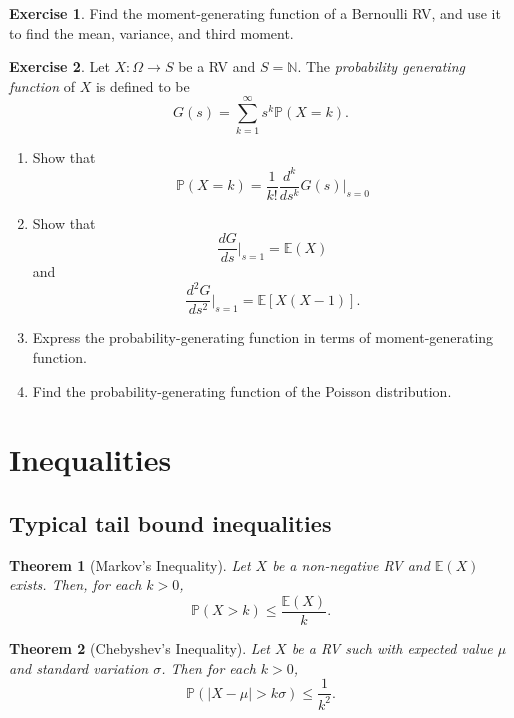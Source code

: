\documentclass[
  openany]{book}
\newtheorem{theorem}{Theorem}[chapter]
\theoremstyle{definition}
\theoremstyle{definition}
\theoremstyle{definition}
\newtheorem{exercise}{Exercise}[chapter]
\theoremstyle{definition}
\theoremstyle{remark}
\begin{document}
\begin{exercise}
Find the moment-generating function of a Bernoulli RV, and use it to find
the mean, variance, and third moment.
\end{exercise}

\begin{exercise}

Let \(X: \Omega \to S\) be a RV and \(S = \mathbb{N}\).
The \emph{probability generating function} of \(X\) is defined to be
\[ G(s) = \sum_{k=1}^\infty s^k \mathbb{P}(X = k). \]

\begin{enumerate}
\def\labelenumi{\alph{enumi}.}
\item
  Show that
  \[ \mathbb{P}( X = k) = \frac{1}{k!} \frac{d^k}{ds^k} G(s) \vert_{s=0} \]
\item
  Show that
  \[ \frac{dG}{ds} \vert_{s=1} = \mathbb{E}(X) \]
  and
  \[ \frac{d^2G}{ds^2} \vert_{s=1} = \mathbb{E}[X(X-1)]. \]
\item
  Express the probability-generating function in terms of moment-generating function.
\item
  Find the probability-generating function of the Poisson distribution.
\end{enumerate}

\end{exercise}

\hypertarget{inequalities}{%
\section{Inequalities}\label{inequalities}}

\hypertarget{typical-tail-bound-inequalities}{%
\subsection{Typical tail bound inequalities}\label{typical-tail-bound-inequalities}}

\begin{theorem}[Markov's Inequality]
Let \(X\) be a non-negative RV and \(\mathbb{E}(X)\) exists.
Then, for each \(k >0\),
\[ \mathbb{P}( X > k) \leq \frac{\mathbb{E}(X)}{k}. \]
\end{theorem}

\begin{theorem}[Chebyshev's Inequality]
Let \(X\) be a RV such with expected value \(\mu\) and standard variation \(\sigma\).
Then for each \(k >0\),
\[ \mathbb{P}(| X - \mu | > k \sigma ) \leq \frac{1}{k^2}. \]
\end{theorem}
\end{document}
